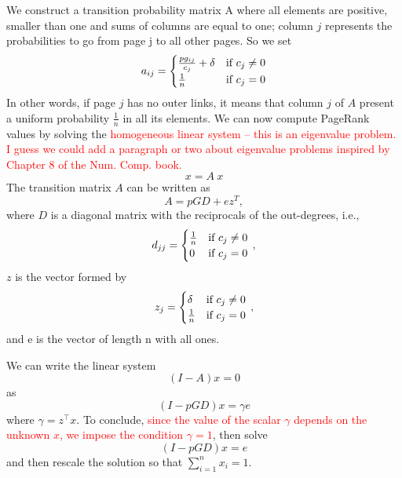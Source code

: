 \documentclass[]{usiinfbachelorproject}
\newcommand\transp[1]{{#1}^{\top}}
\begin{document}
We construct a transition probability matrix A where all elements are positive, smaller than one and sums of columns are equal to one; column $j$ represents the probabilities to go from page j to all other pages. So we set
\begin{equation}\notag
a_{ij} = 
\begin{cases}
\frac{pg_{ij}}{c_{j}} + \delta  & \text{if } c_{j} \neq 0\\
\frac{1}{n} & \text{if } c_{j} = 0
\end{cases}
\end{equation}
In other words, if page $j$ has no outer links, it means that column $j$ of $A$ present a uniform probability $\frac{1}{n}$ in all its elements. We can now compute PageRank values by solving the \textcolor{red}{homogeneous linear system -- this is an eigenvalue problem. I guess we could add a paragraph or two about eigenvalue problems inspired by Chapter 8 of the Num. Comp. book.}
\begin{equation}
x = A\:x
\end{equation}
The transition matrix $A$ can be written as
$$A = pGD+ez^{T}, $$
where $D$ is a diagonal matrix with the reciprocals of the out-degrees, i.e.,
\begin{equation}\notag
d_{jj} = 
\begin{cases}
\frac{1}{n} & \text{if } c_{j} \neq 0\\
0 & \text{if } c_{j} = 0
\end{cases} \,,
\end{equation}
$z$ is the vector formed by
\begin{equation}\notag
z_{j} = 
\begin{cases}
\delta & \text{if } c_{j} \neq 0\\
\frac{1}{n} & \text{if } c_{j} = 0
\end{cases} \,,
\end{equation}
and e is the vector of length n with all ones.

We can write the linear system
$$(I-A)x=0$$
as
$$(I - pGD)x = \gamma e$$
where $\gamma = \transp{z}x$.
To conclude, \textcolor{red}{since the value of the scalar $\gamma$ depends on the unknown $x$, we impose the condition $\gamma = 1$}, then solve
\begin{equation}
(I - pGD)x = e
\end{equation}
and then rescale the solution so that $\sum\limits_{i=1}^{n} x_i = 1$.
\end{document}
